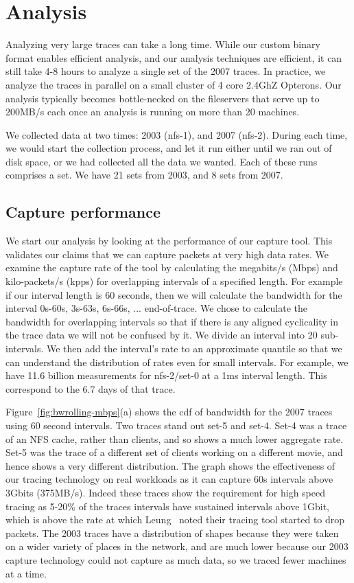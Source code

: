 \section{Analysis}
\label{sec:analysis}

Analyzing very large traces can take a long time.  While our custom
binary format enables efficient analysis, and our analysis techniques
are efficient, it can still take 4-8 hours to analyze a single set of
the 2007 traces.  In practice, we analyze the traces in parallel on a
small cluster of 4 core 2.4GhZ Opterons.  Our analysis typically
becomes bottle-necked on the fileservers that serve up to 200MB/s each
once an analysis is running on more than 20 machines.

We collected data at two times: 2003 (nfs-1), and 2007 (nfs-2).  During
each time, we would start the collection process, and let it run
either until we ran out of disk space, or we had collected all the
data we wanted.  Each of these runs comprises a set.  We have 21 sets
from 2003, and 8 sets from 2007.

\subsection{Capture performance}

We start our analysis by looking at the performance of our capture
tool.  This validates our claims that we can capture packets at very
high data rates.  We examine the capture rate of the tool by
calculating the megabits/s (Mbps) and kilo-packets/s (kpps) for
overlapping intervals of a specified length.  For example if our
interval length is 60 seconds, then we will calculate the bandwidth
for the interval 0s-60s, 3s-63s, 6s-66s, ... end-of-trace.  We chose
to calculate the bandwidth for overlapping intervals so that if there
is any aligned cyclicality in the trace data we will not be confused
by it.  We divide an interval into 20 sub-intervals.  We then add the
interval's rate to an approximate quantile so that we can understand
the distribution of rates even for small intervals.  For example, we
have 11.6 billion measurements for nfs-2/set-0 at a 1ms interval
length.  This correspond to the 6.7 days of that trace.

Figure~\ref{fig:bwrolling-mbps}(a) shows the cdf of bandwidth for the
2007 traces using 60 second intervals.  Two traces stand out set-5 and
set-4.  Set-4 was a trace of an NFS cache, rather than clients, and so
shows a much lower aggregate rate.  Set-5 was the trace of a different
set of clients working on a different movie, and hence shows a very
different distribution.  The graph shows the effectiveness of our
tracing technology on real workloads as it can capture 60s intervals
above 3Gbits (375MB/s).  Indeed these traces show the requirement for
high speed tracing as 5-20\% of the traces intervals have sustained
intervals above 1Gbit, which is above the rate at which
Leung~\cite{LeungUsenix08} noted their tracing tool started to drop
packets.  The 2003 traces have a distribution of shapes because they
were taken on a wider variety of places in the network, and are much
lower because our 2003 capture technology could not capture as much
data, so we traced fewer machines at a time.

